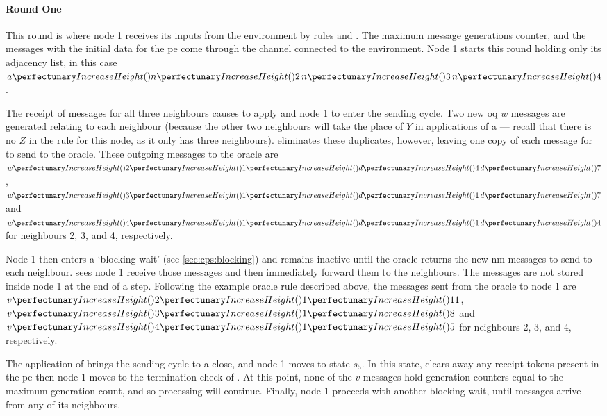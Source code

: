 \paragraph{Round One}
This round is where node 1 receives its inputs from the environment by rules  and .  The maximum message generations counter, and the messages with the initial data for the \gls{pe} come through the channel connected to the environment.  Node 1 starts this round holding only its adjacency list, in this case \(\cpfunc{a}{\cpfunc{n}{2} \, \cpfunc{n}{3} \, \cpfunc{n}{4}}\).

The receipt of messages for all three neighbours causes  to apply and node 1 to enter the sending cycle.  Two new \gls{oq} \(w\) messages are generated relating to each neighbour (because the other two neighbours will take the place of \(Y\) in applications of a --- recall that there is no \(Z\) in the rule for this node, as it only has three neighbours).   eliminates these duplicates, however, leaving one copy of each message for  to send to the oracle.  These outgoing messages to the oracle are \(\cpvw{2}{1}{\cpfunc{d}{4} \, \cpfunc{d}{7}}\), \(\cpvw{3}{1}{\cpfunc{d}{1} \, \cpfunc{d}{7}}\) and \(\cpvw{4}{1}{\cpfunc{d}{1} \, \cpfunc{d}{4}}\) for neighbours 2, 3, and 4, respectively.

Node 1 then enters a `blocking wait' (see \cref{sec:cps:blocking}) and remains inactive until the oracle returns the new \gls{nm} messages to send to each neighbour.   sees node 1 receive those messages and then immediately forward them to the neighbours.  The messages are not stored inside node 1 at the end of a step.  Following the example oracle rule described above, the messages sent from the oracle to node 1 are \(\cpvv{2}{1}{11}\), \(\cpvv{3}{1}{8}\) and \(\cpvv{4}{1}{5}\) for neighbours 2, 3, and 4, respectively.

The application of  brings the sending cycle to a close, and node 1 moves to state \(s_5\).  In this state,  clears away any receipt tokens present in the \gls{pe} then node 1 moves to the termination check of .  At this point, none of the \(v\) messages hold generation counters equal to the maximum generation count, and so processing will continue.  Finally, node 1 proceeds with another blocking wait, until messages arrive from any of its neighbours.

